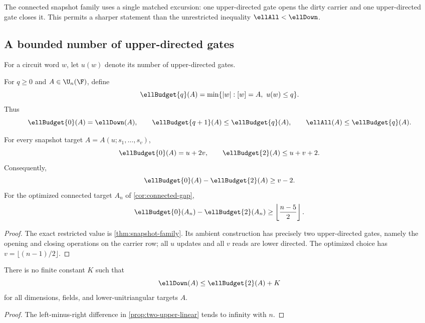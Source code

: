 The connected snapshot family uses a single matched excursion: one upper-directed gate opens the dirty carrier and one upper-directed gate closes it.  This permits a sharper statement than the unrestricted inequality $\ellAll<\ellDown$.

\subsection{A bounded number of upper-directed gates}

For a circuit word $w$, let $u(w)$ denote its number of upper-directed gates.

\begin{definition}
For $q\ge0$ and $A\in\U_n(\F)$, define
\[
\ellBudget{q}(A)
=
\min\{|w|:[w]=A,\ u(w)\le q\}.
\]
Thus
\[
\ellBudget{0}(A)=\ellDown(A),
\qquad
\ellBudget{q+1}(A)\le\ellBudget{q}(A),
\qquad
\ellAll(A)\le\ellBudget{q}(A).
\]
\end{definition}

\begin{proposition}\label{prop:two-upper-linear}
For every snapshot target $A=A(u;s_1,\ldots,s_v)$,
\[
\ellBudget{0}(A)=u+2v,
\qquad
\ellBudget{2}(A)\le u+v+2.
\]
Consequently,
\[
\ellBudget{0}(A)-\ellBudget{2}(A)\ge v-2.
\]
For the optimized connected target $A_n$ of \cref{cor:connected-gap},
\[
\ellBudget{0}(A_n)-\ellBudget{2}(A_n)
\ge
\left\lfloor\frac{n-5}{2}\right\rfloor.
\]
\end{proposition}

\begin{proof}
The exact restricted value is \cref{thm:snapshot-family}.  Its ambient construction has precisely two upper-directed gates, namely the opening and closing operations on the carrier row; all $u$ updates and all $v$ reads are lower directed.  The optimized choice has $v=\lfloor(n-1)/2\rfloor$.
\end{proof}

\begin{corollary}\label{cor:no-budget-only}
There is no finite constant $K$ such that
\[
\ellDown(A)\le\ellBudget{2}(A)+K
\]
for all dimensions, fields, and lower-unitriangular targets $A$.
\end{corollary}

\begin{proof}
The left-minus-right difference in \cref{prop:two-upper-linear} tends to infinity with $n$.
\end{proof}

